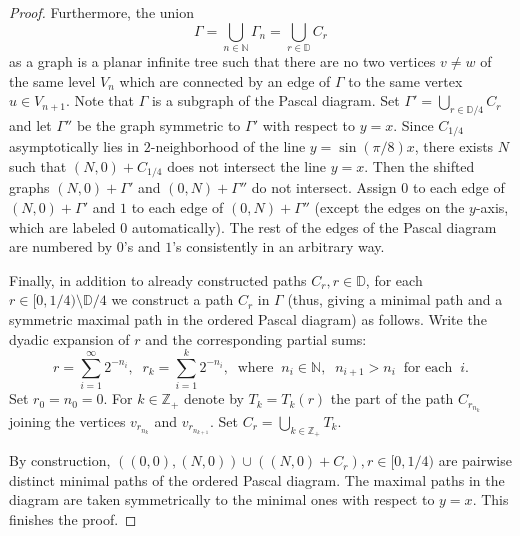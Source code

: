 \documentclass[11pt, twoside]{amsart}
\theoremstyle{definition}
\theoremstyle{remark}
\theoremstyle{plain}
\numberwithin{equation}{section}
\begin{document}
\begin{proof}
 Furthermore, the union 
 $$
 \Gamma=\bigcup\limits_{n\in\mathbb N} \Gamma_n=\bigcup\limits_{r\in\mathbb D} C_r
 $$ 
 as a graph is a planar infinite tree such that there are no two vertices $v\neq w$ of the same level $V_n$ which are connected by an edge of $\Gamma$ to the same vertex $u\in V_{n+1}$. Note that $\Gamma$ is a subgraph of the Pascal diagram. Set $\Gamma'=\bigcup\limits_{r\in\mathbb D/4} C_r$ and let $\Gamma''$ be the graph symmetric to $\Gamma'$ with respect to $y=x$. Since $C_{1/4}$ asymptotically lies in $2$-neighborhood of the line $y=\sin(\pi/8)x$, there exists $N$ such that $(N,0)+C_{1/4}$ does not intersect the line $y=x$. Then the shifted graphs $(N,0)+\Gamma'$ and $(0,N)+\Gamma''$ do not intersect. Assign $0$ to each edge of $(N,0)+\Gamma'$ and $1$ to each edge of $(0,N)+\Gamma''$ (except the edges on the $y$-axis, which are labeled $0$ automatically). The rest of the edges of the Pascal diagram are numbered by $ 0$'s and $ 1$'s consistently in an arbitrary way. 

 Finally, in addition to already constructed paths $C_r,r\in\mathbb D$, for each $r\in [0,1/4)\setminus \mathbb D/4$ we construct a path $C_r$ in $\Gamma$ (thus, giving a minimal path and a symmetric maximal path in the ordered Pascal diagram) as follows. Write the dyadic expansion of $r$ and the corresponding partial sums: $$r=\sum\limits_{i=1}^\infty 2^{-n_i},\;\;r_k=\sum\limits_{i=1}^k 2^{-n_i},\;\;\text{where}\;\;n_i\in\mathbb N,\;\;n_{i+1}>n_i\;\;\text{for each}\;\;i.$$ Set $r_0=n_0=0$. For $k\in\mathbb Z_+$ denote by $T_k=T_k(r)$ the part of the path $C_{r_{n_k}}$ joining the vertices $v_{r_{n_k}}$ and $v_{r_{n_{k+1}}}$. Set $C_r=\bigcup_{k\in\mathbb Z_+}T_k$. 
 
 By construction, $((0,0),(N,0))\cup ((N,0)+C_r),r\in [0,1/4)$ are pairwise distinct minimal paths of the ordered Pascal diagram. 
 The maximal paths in the diagram are taken symmetrically to the minimal ones with respect to $y=x$. This finishes the proof.
\end{proof}
\end{document}
